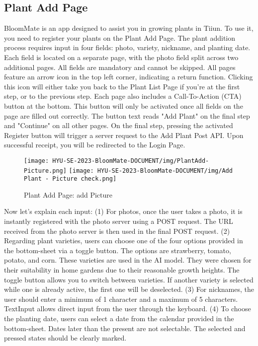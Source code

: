 \documentclass[conference, a4paper]{IEEEtran}
\begin{document}
\subsection{Plant Add Page}
BloomMate is an app designed to assist you in growing plants in Tiiun. To use it, you need to register your plants on the Plant Add Page. The plant addition process requires input in four fields: photo, variety, nickname, and planting date. Each field is located on a separate page, with the photo field split across two additional pages. All fields are mandatory and cannot be skipped. All pages feature an arrow icon in the top left corner, indicating a return function. Clicking this icon will either take you back to the Plant List Page if you're at the first step, or to the previous step. Each page also includes a Call-To-Action (CTA) button at the bottom. This button will only be activated once all fields on the page are filled out correctly. The button text reads "Add Plant" on the final step and "Continue" on all other pages. On the final step, pressing the activated Register button will trigger a server request to the Add Plant Post API. Upon successful receipt, you will be redirected to the Login Page.
    \begin{figure}[h]
    \centerline{
        \texttt{[image: HYU-SE-2023-BloomMate-DOCUMENT/img/PlantAdd-Picture.png]}
        \texttt{[image: HYU-SE-2023-BloomMate-DOCUMENT/img/Add Plant - Picture check.png]}
    }
    \label{fig}
    \caption{Plant Add Page: add Picture}
    \end{figure}

Now let's explain each input: (1) For photos, once the user takes a photo, it is instantly registered with the photo server using a POST request. The URL received from the photo server is then used in the final POST request. (2) Regarding plant varieties, users can choose one of the four options provided in the bottom-sheet via a toggle button. The options are strawberry, tomato, potato, and corn. These varieties are used in the AI model. They were chosen for their suitability in home gardens due to their reasonable growth heights. The toggle button allows you to switch between varieties. If another variety is selected while one is already active, the first one will be deselected. (3) For nicknames, the user should enter a minimum of 1 character and a maximum of 5 characters. TextInput allows direct input from the user through the keyboard. (4) To choose the planting date, users can select a date from the calendar provided in the bottom-sheet. Dates later than the present are not selectable. The selected and pressed states should be clearly marked.
\end{document}
